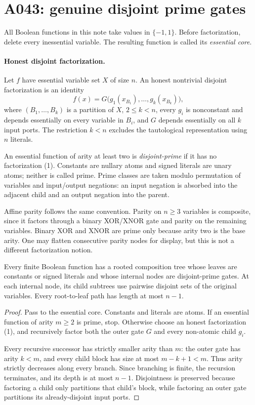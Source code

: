 \section*{A043: genuine disjoint prime gates}

All Boolean functions in this note take values in $\{-1,1\}$.  Before
factorization, delete every inessential variable.  The resulting function is
called its \emph{essential core}.

\paragraph{Honest disjoint factorization.}
Let $f$ have essential variable set $X$ of size $n$.  An honest nontrivial
disjoint factorization is an identity
\[
 f(x)=G\bigl(g_1(x_{B_1}),\ldots,g_k(x_{B_k})\bigr),             \tag{1}
\]
where $(B_1,\ldots,B_k)$ is a partition of $X$, $2\le k<n$, every
$g_i$ is nonconstant and depends essentially on every variable in $B_i$,
and $G$ depends essentially on all $k$ input ports.  The restriction $k<n$
excludes the tautological representation using $n$ literals.

An essential function of arity at least two is \emph{disjoint-prime} if it
has no factorization (1).  Constants are nullary atoms and signed literals
are unary atoms; neither is called prime.  Prime classes are taken modulo
permutation of variables and input/output negations: an input negation is
absorbed into the adjacent child and an output negation into the parent.

Affine parity follows the same convention.  Parity on $n\ge3$ variables is
composite, since it factors through a binary XOR/XNOR gate and parity on the
remaining variables.  Binary XOR and XNOR are prime only because arity two
is the base arity.  One may flatten consecutive parity nodes for display,
but this is not a different factorization notion.

\begin{theorem}
Every finite Boolean function has a rooted composition tree whose leaves are
constants or signed literals and whose internal nodes are disjoint-prime
gates.  At each internal node, its child subtrees use pairwise disjoint sets
of the original variables.  Every root-to-leaf path has length at most
$n-1$.
\end{theorem}

\begin{proof}
Pass to the essential core.  Constants and literals are atoms.  If an
essential function of arity $m\ge2$ is prime, stop.  Otherwise choose an
honest factorization (1), and recursively factor both the outer gate $G$ and
every non-atomic child $g_i$.

Every recursive successor has strictly smaller arity than $m$: the outer
gate has arity $k<m$, and every child block has size at most $m-k+1<m$.
Thus arity strictly decreases along every branch.  Since branching is finite,
the recursion terminates, and its depth is at most $n-1$.  Disjointness is
preserved because factoring a child only partitions that child's block, while
factoring an outer gate partitions its already-disjoint input ports.
\end{proof}

